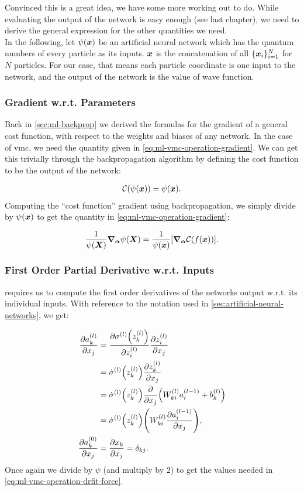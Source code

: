 \documentclass[Thesis.tex]{subfiles}
\begin{document}
Convinced this is a great idea, we have some more working out to do. While
evaluating the output of the network is easy enough (see last chapter), we need
to derive the general expression for the other quantities we need.\\

In the following, let $\psi(\bm{x})$ be an artificial neural network which has the
quantum numbers of every particle as its inputs. $\bm{x}$ is the concatenation of
all $\{\bm{x}_i\}_{i=1}^N$ for $N$ particles. For our case, that means each
particle coordinate is one input to the network, and the output of the network
is the value of wave function.

\subsubsection{Gradient w.r.t. Parameters}

Back in \cref{sec:ml-backprop} we derived the formulas for the gradient of a
general cost function, with respect to the weights and biases of any network. In
the case of \gls{vmc}, we need the quantity given in
\cref{eq:ml-vmc-operation-gradient}. We can get this trivially through the
backpropagation algorithm by defining the cost function to be the output of the
network:

\begin{align}
  \mathcal{C}(\psi(\bm{x})) = \psi(\bm{x}).
\end{align}
Computing the ``cost function'' gradient using backpropagation, we simply divide
by $\psi(\bm{x})$ to get the quantity in \cref{eq:ml-vmc-operation-gradient}:

\begin{align}
    \frac{1}{\psi(\bm{X})}\grad_{\bm{\alpha}}{\psi(\bm{X})} = \frac{1}{\psi(\bm{x})}\qty[\grad_{\bm{\alpha}}{\mathcal{C}(f(\bm{x}))}].
\end{align}

\subsubsection{First Order Partial Derivative w.r.t. Inputs}

 requires us to compute the first order
derivatives of the networks output w.r.t. its individual inputs. With reference
to the notation used in \cref{sec:artificial-neural-networks}, we get:

\begin{align}
  \pdv{a_k^{(l)}}{x_j} &= \pdv{\sigma^{(l)}\qty(z_k^{(l)})}{z_i^{(l)}}\pdv{z_i^{(l)}}{x_j}\\
  &= \dot\sigma^{(l)}\qty(z_k^{(l)})\pdv{z_k^{(l)}}{x_j}\\
  &= \dot\sigma^{(l)}\qty(z_k^{(l)})\pdv{}{x_j}\qty(W_{ki}^{(l)}a_i^{(l-1)} + b^{(l)}_k)\\
  &= \dot\sigma^{(l)}\qty(z_k^{(l)})\qty(W^{(l)}_{ki}\pdv{a_i^{(l-1)}}{x_j})\label{eq:first-order-partial-nn},\\
  \pdv{a_k^{(0)}}{x_j} &= \pdv{x_k}{x_j} = \delta_{kj}.
\end{align}
Once again we divide by $\psi$ (and multiply by 2) to get the values needed in
\cref{eq:ml-vmc-operation-drfit-force}.
\end{document}
